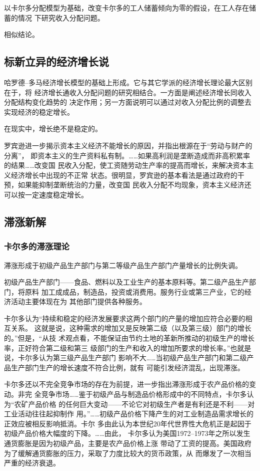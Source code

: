 以卡尔多分配模型为基础，改变卡尔多的工人储蓄倾向为零的假设，在工人存在储蓄的情况
下研究收入分配问题。

相似结论。

\subsection{标新立异的经济增长说}

哈罗德--多马经济增长模型的基础上形成。它与其它学派的经济增长理论最大区别在于，将
经济增长通收入分配问题的研究相结合。一方面是阐述经济增长同收入分配结构变化趋势的
决定作用；另一方面说明可以通过对收入分配比例的调整去实现经济的稳定增长。

在现实中，增长绝不是稳定的。

罗宾逊进一步揭示资本主义经济不能增长的原因，并指出根源在于“劳动与财产的分离”，
即资本主义的生产资料私有制。……如果高利润是垄断造成而非高积累率的结果……改变国
民收入分配，使工资随劳动生产率的提高而增长，来解决资本主义经济增长中出现的不正常
状态。很明显，罗宾逊的基本看法是通过政府的干预，如果能抑制垄断统治的力量，改变国
民收入分配不均现象，资本主义经济还可以按一定速度稳定增长。

\subsection{滞涨新解}

\subsubsection{卡尔多的滞涨理论}

滞涨形成于初级产品生产部门与第二等级产品生产部门产量增长的比例失调。

初级产品生产部门——食品、燃料以及工业生产的基本原料等。第二级产品生产部门，将原料
加工成成品，制造品，投资或消费用。服务行业或第三产业，它的经济活动主要体现在为
其他部门提供各种服务。

卡尔多认为“持续和稳定的经济发展要求这两个部门的产量的增加应符合必要的相互关系。
这就是说，这种需求的增加又是反映第二级（以及第三级）部门的增长的。”但是，“从技
术观点看，不能保证由节约土地的革新所推动的初级生产的增长率，正好符合第二级和第三
级部门的生产和收入的增加所要求的增长率。”也就是说，卡尔多认为第三级产品生产部门
影响不大……当初级产品生产部门和第二级产品生产部门生产的增长速度不符合比例，就有
可能引发经济混乱，出现滞涨。

卡尔多还以不完全竞争市场的存在为前提，进一步指出滞涨形成于农产品价格的变动。非完
全竞争市场……鉴于初级产品与制造品价格形成中的不同特点，卡尔多认为“农矿产品价格
的任何巨大变动——不论它对初级生产者是有利还是不利——对工业活动往往起抑制作
用。”……初级产品价格下降产生的对工业制造品需求增长的正效应被相反影响抵消。卡尔
多由此认为本世纪20年代世界性大危机正是起因于初级产品价格大幅度的下降。……由此，
卡尔多认为美国1972--1973年之所以发生通货膨胀是因为初级产品，主要是农产品价格上涨
带动了工资的提高。美国政府为了缓解通货膨胀的压力，采取了力度比较大的货币政策，从
而爆发了一次相当严重的经济衰退。

